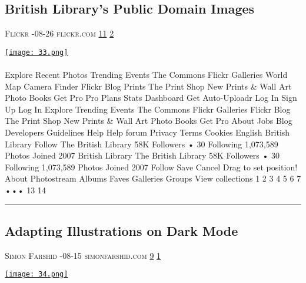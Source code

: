 \documentclass[10pt,a4paper]{article}
\begin{document}
\begin{multicols*}{2}
\begin{minipage}{\linewidth}
\subsection{British Library's Public Domain Images}
\textsc{\footnotesize
{\scriptsize\faUser}\space 
Flickr 
{\scriptsize\faCalendar}-08-26 
{\scriptsize\faGlobe}\space 
flickr.com 
{\scriptsize\faThumbsOUp}\space 
\href{http://news.ycombinator.com/item?id=37165281\&utm\_term=comment}{11} 
{\scriptsize\faComments}\space 
\href{http://news.ycombinator.com/item?id=37165281\&utm\_term=comment}{2} 
}
\par\medskip\noindent
\href{https://www.flickr.com/photos/britishlibrary/albums/?utm\_source=hackernewsletter\&utm\_medium=email\&utm\_term=design}{
    \texttt{[image: 33.png]}
}
\end{minipage}
\paragraph{}
Explore
Recent Photos
Trending
Events
The Commons
Flickr Galleries
World Map
Camera Finder
Flickr Blog
Prints
The Print Shop
New
Prints \& Wall Art
Photo Books
Get Pro
Pro Plans
Stats Dashboard
Get Auto-Uploadr
Log In
Sign Up
Log In
Explore
Trending
Events
The Commons
Flickr Galleries
Flickr Blog
The Print Shop
New
Prints \& Wall Art
Photo Books
Get Pro
About
Jobs
Blog
Developers
Guidelines
Help
Help forum
Privacy
Terms
Cookies
English
British Library
Follow
The British Library
58K Followers
•
30 Following
1,073,589 Photos
Joined 2007
British Library
The British Library
58K Followers
•
30 Following
1,073,589 Photos
Joined 2007
Follow
Save
Cancel
Drag to set position!
About
Photostream
Albums
Faves
Galleries
Groups
View collections
1
2
3
4
5
6
7
•••
13
14
\par\noindent\textcolor{red}{\rule{\linewidth}{0.2mm}}
\vfill
\null
\noindent\begin{minipage}{\linewidth}
\subsection{Adapting Illustrations on Dark Mode}
\textsc{\footnotesize
{\scriptsize\faUser}\space 
Simon Farshid 
{\scriptsize\faCalendar}-08-15 
{\scriptsize\faGlobe}\space 
simonfarshid.com 
{\scriptsize\faThumbsOUp}\space 
\href{http://news.ycombinator.com/item?id=37133657\&utm\_term=comment}{9} 
{\scriptsize\faComments}\space 
\href{http://news.ycombinator.com/item?id=37133657\&utm\_term=comment}{1} 
}
\par\medskip\noindent
\href{https://blog.simonfarshid.com/adapting-illustrations-to-dark-mode?utm\_source=hackernewsletter\&utm\_medium=email\&utm\_term=design}{
    \texttt{[image: 34.png]}
}
\end{minipage}

\end{multicols*}
\end{document}
